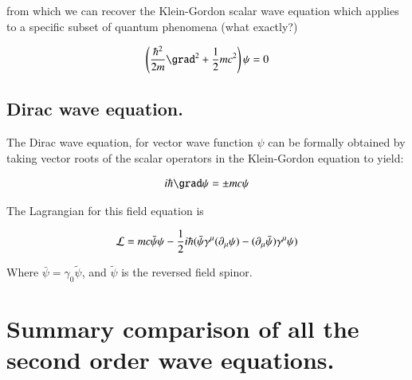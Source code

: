from which we can recover the Klein-Gordon scalar wave equation which applies to a
specific subset of quantum phenomena (what exactly?)

\begin{align*}
\left(\frac{\hbar^2}{2m} \grad^2 + \inv{2} m c^2\right) \psi = 0 \\
\end{align*}

\subsection{Dirac wave equation. }

The Dirac wave equation, for vector wave function $\psi$ can be formally
obtained by
taking vector roots of the scalar operators in the Klein-Gordon equation
to yield:

\begin{align*}
i \hbar \grad \psi = \pm m c \psi
\end{align*}

The Lagrangian for this field equation is

\begin{align*}
\mathcal{L} = mc \bar{\psi}\psi - {\frac{1}{2}i\hbar}(\bar{\psi}\gamma^\mu (\partial_\mu\psi) - (\partial_\mu\bar{\psi})\gamma^\mu \psi)
\end{align*}

Where $\bar\psi = \gamma_0 \tilde{\psi}$, and $\tilde{\psi}$ is the reversed field spinor.

\section{Summary comparison of all the second order wave equations. }

